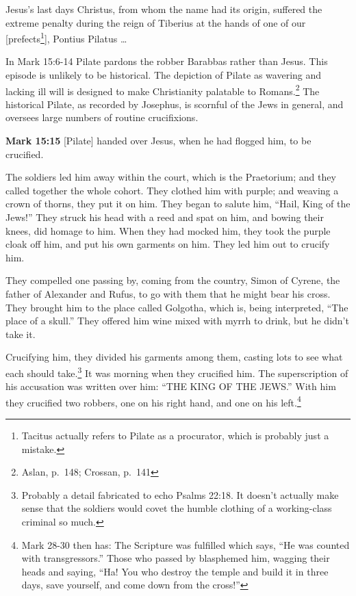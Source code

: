 \documentclass[10pt,twoside]{article} %
\newcommand{\doimage}[2]{\texttt{[image: \#2]}\label{fig:#2}}
\newcommand{\figbasic}[4]{ %
    \ifthenelse{\isodd{\pageref{fig:#2}}}{}{\hfill}
    \ifstrempty{#3}{
      \doimage{#1}{#2}
    }{
      \makebox{\doimage{#1}{#2} \\ #3}
    }
    \ifthenelse{\isodd{\pageref{fig:#2}}}{\hfill}{}
    \par
}
\newcommand{\fig}[2][0.4]{
  \figbasic{#1}{#2}{}{}
}
\newcommand{\quotesize}{\normalsize{}}
\newcommand{\comm}[1]{\begingroup \color{black!50} #1\endgroup}
\newenvironment{quotetext}{\begingroup\quotesize}{\endgroup}
\newcommand{\intex}[1]{\index[texts]{#1}}
\newcommand{\reftex}[1]{#1\intex{#1}}
\newcommand{\bible}[2]{\begin{quotetext}\textbf{#1}\intex{#1} #2\end{quotetext}}
\newcommand{\gospelmark}[2]{\bible{Mark #1}{#2}}
\begin{document}
\begin{section}{Jesus's last days}
\begin{quotetext}
Christus, from whom the name had its origin, suffered
the extreme penalty during the reign of Tiberius at the hands of one
of our [prefects\footnote{Tacitus actually refers to Pilate as a procurator, which is probably just a mistake.}], Pontius Pilatus \ldots
\end{quotetext}


\comm{In Mark 15:6-14 Pilate pardons the robber Barabbas rather than Jesus. This episode is unlikely to be historical.
The depiction of Pilate as wavering and lacking ill will is designed to make Christianity palatable to Romans.\footnote{Aslan, p.~148; Crossan,
p.~141} The historical Pilate, as recorded by Josephus, is scornful of the Jews in general, and oversees large numbers
of routine crucifixions.
}

\fig{ecce-homo}

\gospelmark{15:15}{
[Pilate] handed over Jesus, when he had flogged him, to be crucified.

  The soldiers led him away within the court, which is the Praetorium; and they called together the whole cohort.   They clothed him with purple; and weaving a crown of thorns, they put it on him.   They began to salute him, ``Hail, King of the Jews!''   They struck his head with a reed and spat on him, and bowing their knees, did homage to him.   When they had mocked him, they took the purple cloak off him, and put his own garments on him. They led him out to crucify him.

  They compelled one passing by, coming from the country, Simon of Cyrene, the father of Alexander and Rufus, to go with them that he might bear his cross.   They brought him to the place called Golgotha, which is, being interpreted, ``The place of a skull.''   They offered him wine mixed with myrrh to drink, but he didn't take it.

  Crucifying him, they divided his garments among them, casting lots to see what each should take.\footnote{Probably a detail fabricated
to echo \reftex{Psalms 22:18}. It doesn't actually make sense that the soldiers would covet the humble clothing of a working-class criminal so much.}
It was morning when they crucified him.   The superscription of his accusation was written over him: ``THE KING OF THE JEWS.''   With him they crucified two robbers, one on his right hand, and one on his left.\footnote{Mark 28-30 then has: The Scripture was fulfilled which says, 
``He was counted with transgressors.'' Those who passed by blasphemed him, wagging their heads and saying, ``Ha! You who destroy the temple and build it in three days,   save yourself, and come down from the cross!''}
}


\end{section}
\end{document}
